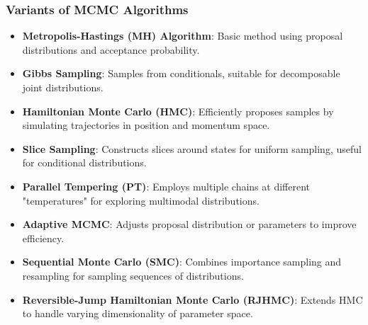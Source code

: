 \documentclass[aspectratio=169]{beamer}
\begin{document}
\begin{frame}\frametitle{Variants of MCMC Algorithms}

\begin{itemize}
    \item \textbf{Metropolis-Hastings (MH) Algorithm}: Basic method using proposal distributions and acceptance probability.
    
    \item \textbf{Gibbs Sampling}: Samples from conditionals, suitable for decomposable joint distributions.
    
    \item \textbf{Hamiltonian Monte Carlo (HMC)}: Efficiently proposes samples by simulating trajectories in position and momentum space.
    
    \item \textbf{Slice Sampling}: Constructs slices around states for uniform sampling, useful for conditional distributions.
    
    \item \textbf{Parallel Tempering (PT)}: Employs multiple chains at different "temperatures" for exploring multimodal distributions.
    
    \item \textbf{Adaptive MCMC}: Adjusts proposal distribution or parameters to improve efficiency.
    
    \item \textbf{Sequential Monte Carlo (SMC)}: Combines importance sampling and resampling for sampling sequences of distributions.
    
    \item \textbf{Reversible-Jump Hamiltonian Monte Carlo (RJHMC)}: Extends HMC to handle varying dimensionality of parameter space.
\end{itemize}

\end{frame}
\end{document}
